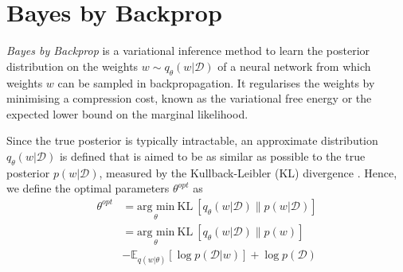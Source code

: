 \section{Bayes by Backprop}
\textit{Bayes by Backprop} \cite{graves2011practical, blundell2015weight} is a variational inference method to learn the posterior distribution on the weights $w \sim q_{\theta}(w|\mathcal{D})$ of a neural network from which weights $w$ can be sampled in backpropagation. 
It regularises the weights by minimising a compression cost, known as the variational free energy or the expected lower bound on the marginal likelihood.

Since the true posterior is typically intractable, an approximate distribution $q_{\theta}(w|\mathcal{D})$ is defined that is aimed to be as similar as possible to the true posterior $p(w|\mathcal{D})$, measured by the Kullback-Leibler (KL) divergence \cite{kullback1951information}. Hence, we define the optimal parameters $\theta^{opt}$ as
\begin{equation}
    \begin{aligned} \label{KL}
        \theta^{opt}&=\underset{\theta}{\text{arg min}}\ \text{KL} \ [q_{\theta}(w|\mathcal{D})\|p(w|\mathcal{D})] \\
        &=\underset{\theta}{\text{arg min}}\ \text{KL} \ [q_{\theta}(w|\mathcal{D})\|p(w)] \\ & -\mathbb{E}_{q(w|\theta)}[\log p(\mathcal{D}|w)]+\log p(\mathcal{D})
    \end{aligned}
\end{equation}

